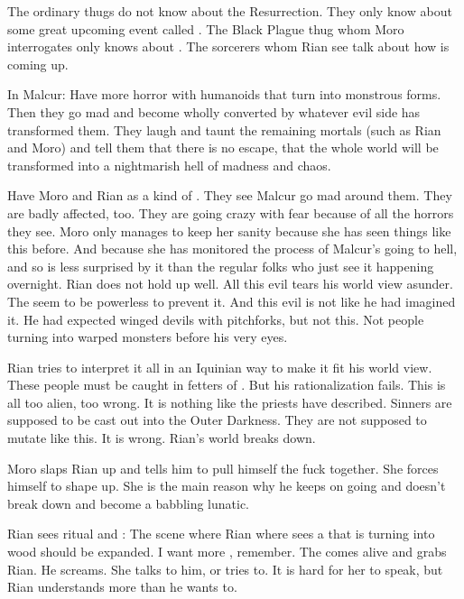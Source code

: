   The ordinary thugs do not know about the Resurrection. 
  They only know about some great upcoming event called . 
  The Black Plague thug whom Moro interrogates only knows about . 
  The sorcerers whom Rian see talk about how  is coming up. 

In Malcur:
  Have more horror with humanoids that turn into monstrous forms.
  Then they go mad and become wholly converted by whatever evil side has transformed them.
  They laugh and taunt the remaining mortals (such as Rian and Moro) and tell them that there is no escape, that the whole world will be transformed into a nightmarish hell of madness and chaos. 
  
  Have Moro and Rian as a kind of .
  They see Malcur go mad around them.
  They are badly affected, too.
  They are going crazy with fear because of all the horrors they see.
  Moro only manages to keep her sanity because she has seen things like this before. 
  And because she has monitored the process of Malcur's going to hell, and so is less surprised by it than the regular folks who just see it happening overnight. 
  Rian does not hold up well. 
  All this evil tears his world view asunder. 
  The \sephiroth seem to be powerless to prevent it. 
  And this evil is not like he had imagined it.
  He had expected winged devils with pitchforks, but not this. 
  Not people turning into warped monsters before his very eyes. 
  
  Rian tries to interpret it all in an Iquinian way to make it fit his world view. 
  These people must be caught in fetters of \itzach. 
  But his rationalization fails. 
  This is all too alien, too wrong. 
  It is nothing like the priests have described. 
  Sinners are supposed to be cast out into the Outer Darkness. 
  They are not supposed to mutate like this. 
  It is wrong. 
  Rian's world breaks down.
  
  Moro slaps Rian up and tells him to pull himself the fuck together. 
  She forces himself to shape up.
  She is the main reason why he keeps on going and doesn't break down and become a babbling lunatic. 

Rian sees ritual and \banerats:
  The scene where Rian where sees a \sphyle that is turning into wood should be expanded.
  I want more , remember. 
  The \sphyle comes alive and grabs Rian. 
  He screams.
  She talks to him, or tries to.
  It is hard for her to speak, but Rian understands more than he wants to. 
  

